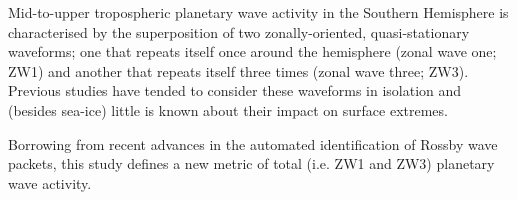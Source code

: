 Mid-to-upper tropospheric planetary wave activity in the Southern Hemisphere is characterised by the superposition of two zonally-oriented, quasi-stationary waveforms; one that repeats itself once around the hemisphere (zonal wave one; ZW1) and another that repeats itself three times (zonal wave three; ZW3). Previous studies have tended to consider these waveforms in isolation and (besides sea-ice) little is known about their impact on surface extremes. 

Borrowing from recent advances in the automated identification of Rossby wave packets, this study defines a new metric of total (i.e. ZW1 and ZW3) planetary wave activity. 